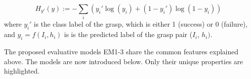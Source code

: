 \begin{equation}
H_{y'}(y) := - \sum_{i} ({y_i' \log(y_i) + (1-y_i') \log (1-y_i)})
\label{equation:crossentropy}
\end{equation}
where $y_i'$ is the class label of the grasp, which is either 1 (success) or 0 (failure), and $y_i = f(I_i, h_i)$ is is the predicted label of the grasp pair ($I_i$, $h_i)$.

The proposed evaluative models EM1-3 share the common features explained above. The models are now introduced below. Only their unique properties are highlighted.

\begin{figure}[t]
\centering




\end{figure}
